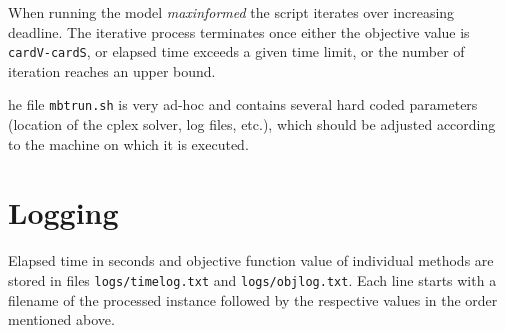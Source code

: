 \documentclass[12pt]{article}
\begin{document}
When running the model \emph{maxinformed} the script iterates over increasing deadline. 
The iterative process terminates once either the objective value is \texttt{cardV-cardS}, or elapsed time exceeds a given time limit, or the number of iteration reaches an upper bound.

he file \texttt{mbtrun.sh} is very ad-hoc and contains several hard coded parameters (location of the cplex solver, log files, etc.), 
which should be adjusted according to the machine on which it is executed.

\section{Logging}

Elapsed time in seconds and objective function value of individual methods are stored in files \texttt{logs/timelog.txt} and \texttt{logs/objlog.txt}.
Each line starts with a filename of the processed instance followed by the respective values in the order mentioned above.
\end{document}
